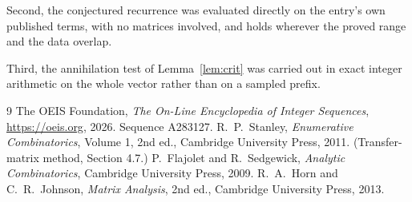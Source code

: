 \documentclass[11pt,a4paper]{article}
\theoremstyle{plain}
\theoremstyle{definition}
\begin{document}
Second, the conjectured recurrence was evaluated directly on the entry's own published terms,
with no matrices involved, and holds wherever the proved range and the data overlap.

Third, the annihilation test of Lemma~\ref{lem:crit} was carried out in exact integer
arithmetic on the whole vector rather than on a sampled prefix.

\begin{thebibliography}{9}
 The OEIS Foundation, \emph{The On-Line Encyclopedia of Integer
Sequences}, \url{https://oeis.org}, 2026. Sequence A283127.
 R.~P.~Stanley, \emph{Enumerative Combinatorics}, Volume 1, 2nd ed.,
Cambridge University Press, 2011. (Transfer-matrix method, Section 4.7.)
 P.~Flajolet and R.~Sedgewick, \emph{Analytic Combinatorics}, Cambridge
University Press, 2009.
 R.~A.~Horn and C.~R.~Johnson, \emph{Matrix Analysis}, 2nd ed., Cambridge
University Press, 2013.
\end{thebibliography}
\end{document}
